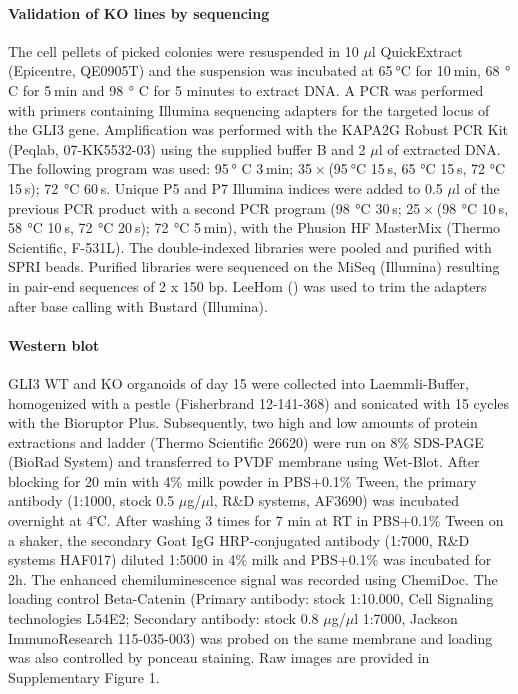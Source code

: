 \paragraph{Validation of KO lines by sequencing}
The cell pellets of picked colonies were resuspended in 10 $\mu$l QuickExtract (Epicentre, QE0905T) and the suspension was incubated at 65 °C for 10 min, 68  ° C for 5 min and 98  ° C for 5 minutes to extract DNA. A PCR was performed with primers containing Illumina sequencing adapters for the targeted locus of the GLI3 gene. Amplification was performed with the KAPA2G Robust PCR Kit (Peqlab, 07-KK5532-03) using the supplied buffer B and 2 $\mu$l of extracted DNA. The following program was used: 95 ° C 3 min; 35 × (95 °C 15 s, 65 °C 15 s, 72  °C 15 s); 72  °C 60 s. Unique P5 and P7 Illumina indices were added to 0.5 $\mu$l of the previous PCR product with a second PCR program (98  °C 30 s; 25 × (98  °C 10 s, 58  °C 10 s, 72  °C 20 s); 72  °C 5 min), with the Phusion HF MasterMix (Thermo Scientific, F-531L). The double-indexed libraries were pooled and purified with SPRI beads. Purified libraries were sequenced on the MiSeq (Illumina) resulting in pair-end sequences of 2 x 150 bp. LeeHom (\cite{renaud_leehom_2014}) was used to trim the adapters after base calling with Bustard (Illumina).
 
\paragraph{Western blot}
GLI3 WT and KO organoids of day 15 were collected into Laemmli-Buffer, homogenized with a pestle (Fisherbrand 12-141-368) and sonicated with 15 cycles with the Bioruptor Plus. Subsequently, two high and low amounts of protein extractions and ladder (Thermo Scientific 26620) were run on 8\% SDS-PAGE (BioRad System) and transferred to PVDF membrane using Wet-Blot. After blocking for 20 min with 4\% milk powder in PBS+0.1\% Tween, the primary antibody (1:1000, stock 0.5 $\mu$g/$\mu$l,  R\&D systems, AF3690) was incubated overnight at 4℃. After washing 3 times for 7 min at RT in PBS+0.1\% Tween on a shaker, the secondary Goat IgG HRP-conjugated antibody (1:7000, R\&D systems HAF017) diluted 1:5000 in 4\% milk and PBS+0.1\%  was incubated for 2h. The enhanced chemiluminescence signal was recorded using ChemiDoc. The loading control Beta-Catenin (Primary antibody: stock 1:10.000, Cell Signaling technologies L54E2; Secondary antibody: stock 0.8 $\mu$g/$\mu$l 1:7000, Jackson ImmunoResearch 115-035-003) was probed on the same membrane and loading was also controlled by ponceau staining. Raw images are provided in Supplementary Figure 1.
 
